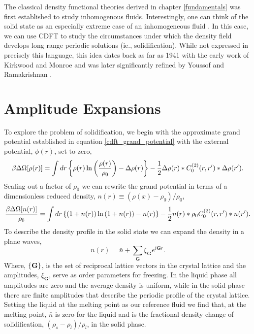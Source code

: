 \label{dft_of_freezing}

The classical density functional theories derived in chapter
\ref{fundamentals} was first established to study inhomogenous fluids.
Interestingly, one can think of the solid state as an especially extreme
case of an inhomogeneous fluid \cite{HANSEN-CH6}.  In this case, we can
use CDFT to study the circumstances under which the density field develops
long range periodic solutions (ie., solidification).  While not expressed
in precisely this language, this idea dates back as far as 1941 with the
early work of Kirkwood and Monroe \cite{KIRKWOOD_MONROE41} and was later
significantly refined by Youssof and Ramakrishnan \cite{RAMAKRISHNAN79}.


\section{Amplitude Expansions} %

To explore the problem of solidification, we begin with the approximate grand
potential established in equation \ref{cdft_grand_potential} with the external
potential, $\phi(r)$, set to zero,
%
\begin{equation}
    \beta \Delta \Omega[\rho(r)] =
        \int dr \left\lbrace 
            \rho(r)\ln\left(\frac{\rho(r)}{\rho_0}\right) - \Delta\rho(r)\right\rbrace
        - \frac{1}{2} \Delta\rho(r) \ast C^{(2)}_0(r, r^\prime)
            \ast \Delta\rho(r^\prime).
\end{equation}
%
Scaling out a factor of $\rho_0$ we can rewrite the grand potential in terms of
a dimensionless reduced density, $n(r) \equiv (\rho(x) - \rho_0)/\rho_0$,
%
\begin{equation}
    \label{gp}
    \frac{\beta \Delta \Omega[n(r)]}{\rho_0} =
        \int dr \left\lbrace 
            (1 + n(r))\ln\left(1 + n(r)\right) - n(r)\right\rbrace
        - \frac{1}{2} n(r) \ast \rho_0 C^{(2)}_0(r, r^\prime) \ast n(r^\prime).
\end{equation}
%
To describe the density profile in the solid state we can expand the density
in a plane waves,
%
\begin{equation}
    \label{expansion}
    n(r) = \bar{n} + \sum_{\mathbf{G}} \xi_{\mathbf{G}} e^{i \mathbf{G} r}.
\end{equation}
%
Where, $\left\lbrace \mathbf{G} \right\rbrace$, is the set of reciprocal lattice
vectors in the crystal lattice and the amplitudes, $\xi_\mathbf{G}$, serve as
order parameters for freezing. In the liquid phase all amplitudes are zero and
the average density is uniform, while in the solid phase there are finite
amplitudes that describe the periodic profile of the crystal lattice. Setting
the liquid at the melting point as our reference fluid we find that, at the 
melting point, $\bar{n}$ is zero for the liquid and is the fractional density
change of solidification, $(\rho_s - \rho_l)/\rho_l$, in the solid phase.

